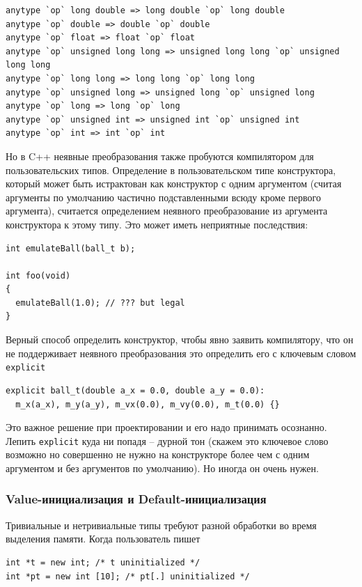\documentclass[a4paper,12pt,oneside]{article}
\begin{document}
\begin{lstlisting}
anytype `op` long double => long double `op` long double
anytype `op` double => double `op` double
anytype `op` float => float `op` float
anytype `op` unsigned long long => unsigned long long `op` unsigned long long
anytype `op` long long => long long `op` long long
anytype `op` unsigned long => unsigned long `op` unsigned long
anytype `op` long => long `op` long
anytype `op` unsigned int => unsigned int `op` unsigned int
anytype `op` int => int `op` int
\end{lstlisting}

Но в C++ неявные преобразования также пробуются компилятором для пользовательских типов. Определение в пользовательском типе конструктора, который может быть истрактован как конструктор с одним аргументом (считая аргументы по умолчанию частично подставленными всюду кроме первого аргумента), считается определением неявного преобразование из аргумента конструктора к этому типу. Это может иметь неприятные последствия:

\begin{lstlisting}
int emulateBall(ball_t b);

int foo(void)
{
  emulateBall(1.0); // ??? but legal
}
\end{lstlisting}

Верный способ определить конструктор, чтобы явно заявить компилятору, что он не поддерживает неявного преобразования это определить его с ключевым словом \lstinline!explicit!

\begin{lstlisting}
explicit ball_t(double a_x = 0.0, double a_y = 0.0):
  m_x(a_x), m_y(a_y), m_vx(0.0), m_vy(0.0), m_t(0.0) {}
\end{lstlisting}

Это важное решение при проектировании и его надо принимать осознанно. Лепить \lstinline!explicit! куда ни попадя -- дурной тон (скажем это ключевое слово возможно но совершенно не нужно на конструкторе более чем с одним аргументом и без аргументов по умолчанию). Но иногда он очень нужен.

\subsubsection{Value-инициализация и Default-инициализация}\label{ValDefInit}

Тривиальные и нетривиальные типы требуют разной обработки во время выделения памяти. Когда пользователь пишет

\begin{lstlisting}
int *t = new int; /* t uninitialized */
int *pt = new int [10]; /* pt[.] uninitialized */
\end{lstlisting}
\end{document}
